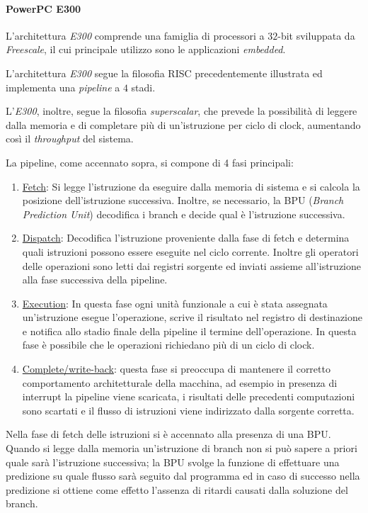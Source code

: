 \paragraph{PowerPC E300}
L'architettura \textit{E300} comprende una famiglia di processori a $32$-bit sviluppata da \textit{Freescale}, il cui principale utilizzo sono le applicazioni \textit{embedded}.

L'architettura \textit{E300} segue la filosofia RISC precedentemente illustrata ed implementa una \textit{pipeline} a $4$ stadi. 

L'\textit{E300}, inoltre, segue la filosofia \textit{superscalar}, che prevede la possibilità di leggere dalla memoria e di completare più di un'istruzione per ciclo di clock, aumentando così il \textit{throughput} del sistema.

La pipeline, come accennato sopra, si compone di 4 fasi principali:

\begin{enumerate}
	\item \underline{Fetch}: Si legge l'istruzione da eseguire dalla memoria di sistema e si calcola la posizione dell'istruzione successiva. Inoltre, se necessario, la BPU (\textit{Branch Prediction Unit}) decodifica i branch e decide qual è l'istruzione successiva.
	\item \underline{Dispatch}: Decodifica l'istruzione proveniente dalla fase di fetch e determina quali istruzioni possono essere eseguite nel ciclo corrente. Inoltre gli operatori delle operazioni sono letti dai registri sorgente ed inviati assieme all'istruzione alla fase successiva della pipeline.
	\item \underline{Execution}: In questa fase ogni unità funzionale a cui è stata assegnata un'istruzione esegue l'operazione, scrive il risultato nel registro di destinazione e notifica allo stadio finale della pipeline il termine dell'operazione. In questa fase è possibile che le operazioni richiedano più di un ciclo di clock.
	\item \underline{Complete/write-back}: questa fase si preoccupa di mantenere il corretto comportamento architetturale della macchina, ad esempio in presenza di interrupt la pipeline viene scaricata, i risultati delle precedenti computazioni sono scartati e il flusso di istruzioni viene indirizzato dalla sorgente corretta.
\end{enumerate}

Nella fase di fetch delle istruzioni si è accennato alla presenza di una BPU. Quando si legge dalla memoria un'istruzione di branch non si può sapere a priori quale sarà l'istruzione successiva; la BPU svolge la funzione di effettuare una predizione su quale flusso sarà seguito dal programma ed in caso di successo nella predizione si ottiene come effetto l'assenza di ritardi causati dalla soluzione del branch.

